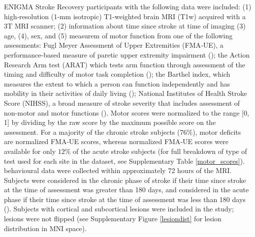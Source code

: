 \documentclass[phd,tocprelim]{cornell}
\begin{document}
ENIGMA Stroke Recovery participants with the following data were included: (1) high‐resolution (1‐mm isotropic) T1‐weighted brain MRI (T1w) acquired with a 3T MRI scanner; (2) information about time since stroke at time of imaging (3) age, (4), sex, and (5) measurem of motor function from one of the following assessments: Fugl Meyer Assessment of Upper Extremities (FMA‐UE), a performance-based measure of paretic upper extremity impairment (\cite{Gladstone2002-fw}); the Action Research Arm test (ARAT) which tests arm function through assessment of the timing and difficulty of motor task completion (\cite{Yozbatiran2008-xv}); the Barthel index, which measures the extent to which a person can function independently and has mobility in their activities of daily living (\cite{Sulter1999-rr}); National Institutes of Health Stroke Score (NIHSS), a broad measure of stroke severity that includes assessment of non-motor and motor functions (\cite{Lyden2017-za}). Motor scores were normalized to the range [0, 1] by dividing by the raw score by the maximum possible score on the assessment. For a majority of the chronic stroke subjects (76$\%$), motor deficits are normalized FMA‐UE scores, whereas  normalized FMA‐UE scores were available for only $12\%$ of the acute stroke subjects (for full breakdown of type of test used for each site in the dataset, see Supplementary Table \ref{motor_scores}). behavioural data were collected within approximately 72 hours of the MRI. Subjects were considered in the chronic phase of stroke if their time since stroke at the time of assessment was greater than 180 days, and considered in the acute phase if their time since stroke at the time of assessment was less than 180 days (\cite{Bernhardt2017-av}). Subjects with cortical and subcortical lesions were included in the study; lesions were not flipped (see Supplementary Figure \ref{lesiondist} for lesion distribution in MNI space). 

\newpage
\end{document}
